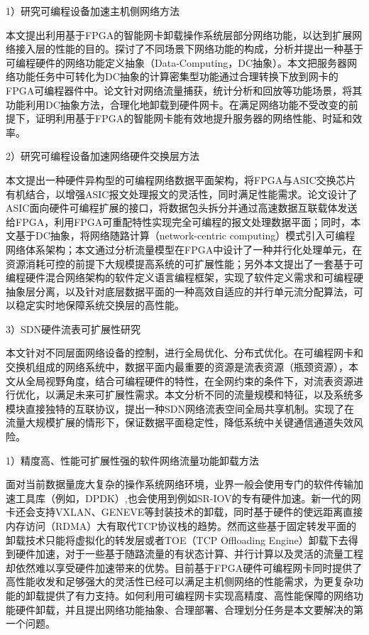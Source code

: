 1）研究可编程设备加速主机侧网络方法

本文提出利用基于FPGA的智能网卡卸载操作系统层部分网络功能，以达到扩展网络接入层的性能的目的。探讨了不同场景下网络功能的构成，分析并提出一种基于可编程硬件的网络功能定义抽象（Data-Computing，DC抽象）。本文把服务器网络功能任务中可转化为DC抽象的计算密集型功能通过合理转换下放到网卡的FPGA可编程器件中。论文针对网络流量捕获，统计分析和回放等功能场景，将其功能利用DC抽象方法，合理化地卸载到硬件网卡。在满足网络功能不受改变的前提下，证明利用基于FPGA的智能网卡能有效地提升服务器的网络性能、时延和效率。

2）研究可编程设备加速网络硬件交换层方法

本文提出一种硬件异构型的可编程网络数据平面架构，将FPGA与ASIC交换芯片有机结合，以增强ASIC报文处理报文的灵活性，同时满足性能需求。论文设计了ASIC面向硬件可编程扩展的接口，将数据包头拆分并通过高速数据互联载体发送给FPGA，利用FPGA可重配特性实现完全可编程的报文处理数据平面；同时，本文基于DC抽象，将网络随路计算（network-centric computing）模式引入可编程网络体系架构；本文通过分析流量模型在FPGA中设计了一种并行化处理单元，在资源消耗可控的前提下大规模提高系统的可扩展性能；另外本文提出了一套基于可编程硬件混合网络架构的软件定义语言编程框架，实现了软件定义需求和可编程硬抽象层分离，以及针对底层数据平面的一种高效自适应的并行单元流分配算法，可以稳定实时地保障系统交换层的高性能。

3）SDN硬件流表可扩展性研究

本文针对不同层面网络设备的控制，进行全局优化、分布式优化。在可编程网卡和交换机组成的网络系统中，数据平面内最重要的资源是流表资源（瓶颈资源），本文从全局视野角度，结合可编程硬件的特性，在全网约束的条件下，对流表资源进行优化，以满足未来可扩展性需求。本文分析不同的流量规模和特征，以及系统多模块直接独特的互联协议，提出一种SDN网络流表空间全局共享机制。实现了在流量大规模扩展的情形下，保证数据平面稳定性，降低系统中关键通信通道失效风险。



1）精度高、性能可扩展性强的软件网络流量功能卸载方法

面对当前数据量庞大复杂的操作系统网络环境，业界一般会使用专门的软件传输加速工具库（例如，DPDK）,也会使用到例如SR-IOV的专有硬件加速。新一代的网卡还会支持VXLAN、GENEVE等封装技术的卸载，同时基于硬件的使远距离直接内存访问（RDMA）大有取代TCP协议栈的趋势。然而这些基于固定转发平面的卸载技术只能将虚拟化的转发层或者TOE（TCP Offloading Engine）卸载下去得到硬件加速，对于一些基于随路流量的有状态计算、并行计算以及灵活的流量工程却依然难以享受硬件加速带来的优势。目前基于FPGA硬件可编程网卡同时提供了高性能收发和足够强大的灵活性已经可以满足主机侧网络的性能需求，为更复杂功能的卸载提供了有力支持。如何利用可编程网卡实现高精度、高性能保障的网络功能硬件卸载，并且提出网络功能抽象、合理部署、合理划分任务是本文要解决的第一个问题。

